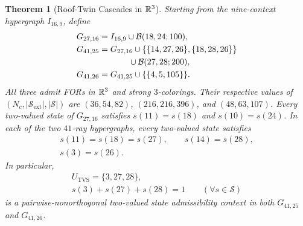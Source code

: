\documentclass[aps,pra,reprint,superscriptaddress,longbibliography,nofootinbib,floatfix,10pt]{revtex4-2}
\newtheorem{theorem}{Theorem}
\theoremstyle{definition}\newtheorem{definition}[theorem]{Definition}
\theoremstyle{remark}\newtheorem{remark}[theorem]{Remark}
\newcommand{\Sc}{\mathcal S}\newcommand{\Cc}{\mathcal C}\newcommand{\Wc}{\mathcal W}
\begin{document}
\begin{theorem}[Roof-Twin Cascades in $\mathbb R^3$]\label{thm:tvs-admissibility}
Starting from the nine-context hypergraph $I_{16,9}$, define
\begin{align*}
G_{27,16}&=I_{16,9}\cup \mathcal B(18,24;100),\\
G_{41,25}&=G_{27,16}\cup\{\{14,27,26\},\{18,28,26\}\}\\
&\hspace{3.5em}\cup \mathcal B(27,28;200),\\
G_{41,26}&=G_{41,25}\cup\{\{4,5,105\}\}.
\end{align*}
All three admit FORs in $\mathbb R^3$ and strong $3$-colorings. Their respective values of $(N_c,|\Sc_{\mathrm{ext}}|,|\Sc|)$ are
$(36,54,82)$, $(216,216,396)$, and $(48,63,107)$.
Every two-valued state of $G_{27,16}$ satisfies $s(11)=s(18)$ and $s(10)=s(24)$. In each of the two $41$-ray hypergraphs, every two-valued state satisfies
\begin{equation}\label{eq:G41-twins}
\begin{gathered}
s(11)=s(18)=s(27),\qquad s(14)=s(28),\\
s(3)=s(26).
\end{gathered}
\end{equation}
In particular,
\begin{equation}\label{eq:U-TVS}
\begin{gathered}
U_{\mathrm{TVS}}=\{3,27,28\},\\
s(3)+s(27)+s(28)=1\qquad(\forall s\in\Sc)
\end{gathered}
\end{equation}
is a pairwise-nonorthogonal two-valued state admissibility context in both $G_{41,25}$ and $G_{41,26}$.
\end{theorem}
\end{document}
